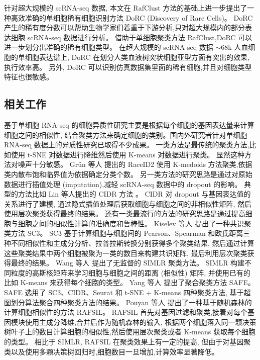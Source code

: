 针对超大规模的 scRNA-seq 数据, 本文在 RafClust 方法的基础上进一步提出了一种高效准确的单细胞稀有细胞识别方法 DoRC (Discovery of Rare Cells)。
DoRC 产生的稀有度分数可以帮助生物学家们着重于下游分析,只对超大规模内的部分表达细胞 scRNA-seq 数据进行分析。
借助于单细胞聚类方法 RafClust,DoRC 可以进一步划分出准确的稀有细胞类型。
在超大规模的 scRNA-seq 数据 ${\sim}68$k 人血细胞的单细胞表达谱上,
 DoRC 在划分人类血液树突状细胞亚型方面有突出的效果, 执行效率高。
另外, DoRC 可以识别仿真数据集里面的稀有细胞,并且对细胞类型特征也很敏感。

\subsection{相关工作}

基于单细胞 RNA-seq 的细胞异质性研究主要是根据每个细胞的基因表达量来计算细胞之间的相似性,
结合聚类方法来确定细胞的类别。国内外研究者针对单细胞 RNA-seq 数据上的异质性研究已取得不少成果。
一类方法是最传统的聚类方法,比如使用 t-SNE 对数据进行降维然后使用 K-means 对数据进行聚类。
显然这种方法对噪声十分敏感。
Gr{\"u}n 等人  提出的 RaceID2 
使用 K-medoids 方法聚类,依据类内散布饱和临界值为依据确定分类个数。
另一类方法的研究思路是通过对原始数据进行插值处理 (imputation),减轻 scRNA-seq 数据中的 dropout 的影响。
典型的方法比如 Lin 等人提出的 CIDR 方法 。
CIDR 对 dropout 与基因表达值的关系进行了建模, 通过隐式插值处理后获取细胞与细胞之间的非相似性矩阵,
然后使用层次聚类获得最终的结果。
还有一类最流行的方法的研究思路是通过提高细胞与细胞之间的相似性计算的准确度和鲁棒性。
Kiselev 等人  提出了一种共识聚类方法 SC3。
SC3 基于计算细胞与细胞间的 Pearson、Spearman 和欧氏距离三种不同相似性和主成分分析、拉普拉斯转换分别获得多个聚类结果,
然后通过计算这些聚类结果中两个细胞被聚为一类的数目来构建共识矩阵,
最后利用层次聚类获得最终的结果。
Wang 等人  提出了无监督的 SIMLR 聚类方法。
SIMLR 构建不同粒度的高斯核矩阵来学习细胞与细胞之间的距离 (相似性) 矩阵,
并使用已有的比如 K-means 来获得每个细胞的类型。
Yang 等人  提出了聚合聚类方法 SAFE。
SAFE 选用了 SC3、CIDR、Seurat 和 t-SNE + K-means 四种聚类方法,
基于超图划分算法聚合四种聚类方法的结果。
Pouyan 等人  提出了一种基于随机森林的计算细胞相似性的方法 RAFSIL。
RAFSIL 首先对基因过滤和聚类,接着对每个基因模块使用主成分降维,合并后作为随机森林的输入,
根据两个细胞落入同一颗决策树叶子上的数目计算细胞的相似性,然后使用层次聚类或者 K-means 获取每个细胞的类型。
相比于 SIMLR, RAFSIL 在聚类效果上有一定的提高,
但由于对基因聚类以及使用多颗决策树回归时,细胞数目一旦增加,计算效率显著降低。

